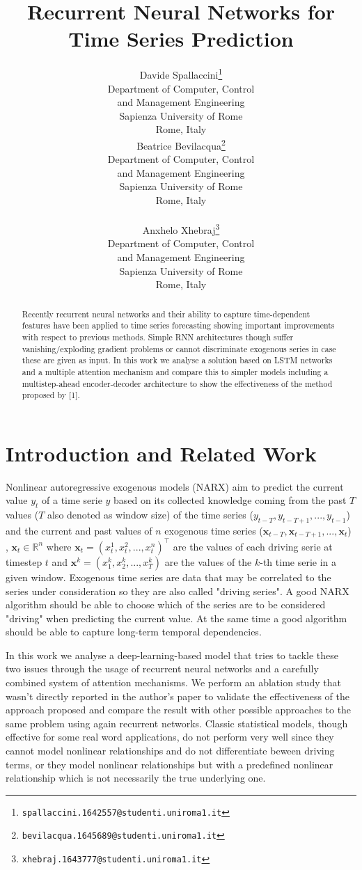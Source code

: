 \documentclass{article}
\title{Recurrent Neural Networks for Time Series Prediction}
\author{
  Davide Spallaccini\thanks{\texttt{spallaccini.1642557@studenti.uniroma1.it}}
\\
  Department of Computer, Control \\ and Management Engineering\\
  Sapienza University of Rome\\
  Rome, Italy \\
  \And
  Beatrice Bevilacqua\thanks{\texttt{bevilacqua.1645689@studenti.uniroma1.it}}
\\
  Department of Computer, Control \\ and Management Engineering\\
  Sapienza University of Rome\\
  Rome, Italy \\
   \\
  \And
  Anxhelo Xhebraj\thanks{\texttt{xhebraj.1643777@studenti.uniroma1.it}} \\
  Department of Computer, Control \\ and Management Engineering\\
  Sapienza University of Rome\\
  Rome, Italy
}
\begin{document}

\maketitle

\begin{abstract}

Recently recurrent neural networks and their ability to capture time-dependent 
features have been applied to time series forecasting showing important 
improvements with respect to  previous methods. Simple RNN architectures though
suffer vanishing/exploding gradient problems or cannot discriminate exogenous 
series in case these are given as input. In this work we analyse a solution based 
on LSTM networks and a multiple attention mechanism and compare this to simpler 
models including a multistep-ahead encoder-decoder architecture to show the 
effectiveness of the method proposed by [1].

\end{abstract}

\section{Introduction and Related Work}
\label{sec:intro}

Nonlinear autoregressive exogenous models (NARX) aim to predict the current
value $y_t$ of a time serie $y$ based on its
collected knowledge coming from the past $T$ values ($T$ also denoted as window 
size) of
the time series ($y_{t-T}, y_{t - T + 1}, ..., y_{t-1}$) and the current and past 
values of $n$
exogenous time series  ($\mathbf{x}_{t-T}, \mathbf{x}_{t - T + 1}, ..., 
\mathbf{x}_{t}$)
, $\mathbf{x}_t \in \mathbb{R}^n$ where $\mathbf{x}_t = (x_t^1, x_t^2, ..., 
x_t^n)^\top$
are the values of each driving serie at timestep $t$ and $\mathbf{x}^k =
(x_1^k, x_2^k, ..., x_T^k)$ are the values of the $k$-th time serie in a given
window. Exogenous time series
are data that may be correlated to the series under consideration so they are
also called "driving series". A good NARX algorithm should be able to choose 
which of the series are to be
considered "driving" when predicting the
current value. At the same time a good algorithm should be able to capture
long-term temporal dependencies.

In this work we analyse a deep-learning-based model that tries to tackle
these two issues through the usage of
recurrent neural networks and a carefully combined system of attention
mechanisms. We perform an ablation study that wasn't directly reported in the
author's paper to validate the effectiveness of the approach proposed and
compare the result with other possible approaches to the same problem using
again recurrent networks. 
Classic statistical models, though effective for some real word applications,
do not perform very well since they cannot
model nonlinear relationships and do not differentiate beween driving terms, or
they model nonlinear relationships
but with a predefined nonlinear relationship which is not necessarily the true
underlying one.
\end{document}
